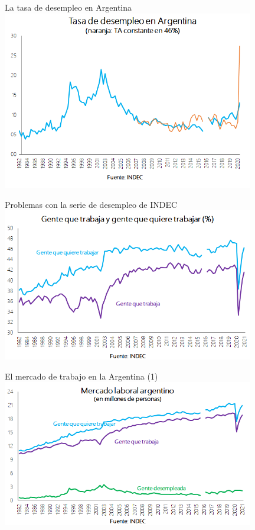 \documentclass{beamer}
\begin{document}
\begin{frame}{La tasa de desempleo en Argentina}
\centering\includegraphics[width=11cm]{Slides Principios de Economia/Figures/P34.png}
\end{frame}

\begin{frame}{Problemas con la serie de desempleo de INDEC}
\centering\includegraphics[width=11cm]{Slides Principios de Economia/Figures/C30.15b.png}
\end{frame}

\begin{frame}{El mercado de trabajo en la Argentina (1)}
\centering\includegraphics[width=11cm]{Slides Principios de Economia/Figures/C30.16b.png}
\end{frame}
\end{document}
